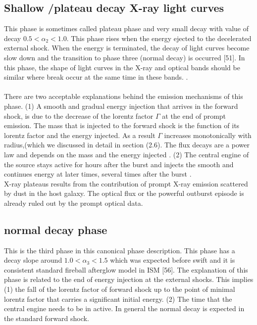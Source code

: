 \subsection{Shallow /plateau decay X-ray light curves }
This phase is sometimes called plateau phase and very small decay with value of decay
$0.5 < \alpha_{2} < 1.0 $. This phase rises when the energy ejected to the decelerated external shock. When the energy is terminated, the decay of light curves become slow down and the transition to phase three (normal decay) is occurred [51]. In this phase, the shape of light curves in the X-ray and optical bands should be similar where break occur at the same time in these bands.\citep{38}\citep{39} .\\\\
There are two acceptable explanations behind the emission mechanisms of this
phase. (1) A smooth and gradual energy injection that arrives in the forward shock,
is due to the decrease of the lorentz factor $ \Gamma $ at the end of prompt emission. The mass that is injected to the forward shock is the function of its lorentz factor and the energy injected. As a result $ \Gamma $ increases monotonically with radius,(which we discussed in detail in section (2.6). The flux decays are a power law and depends on the mass and the energy injected . (2) The central engine of the source stays active for hours after the burst and injects the smooth and continues energy at later times, several times after the burst\citep{40} \citep{41}.\\
X-ray plateaus results from the contribution of prompt X-ray emission scattered
by dust in the host galaxy. The optical flux or the powerful outburst episode is
already ruled out by the prompt optical data\citep{42}.\\
\subsection{normal decay phase}
This is the third phase in this canonical phase description. This phase has a decay
slope around $1.0 < \alpha_{3} < 1.5$ which was expected before swift and it is consistent standard fireball afterglow model in ISM [56]. The explanation of this phase is related to the end of energy injection at the external shocks.
This implies (1) the fall of the lorentz factor of forward shock up to the point of
minimal lorentz factor that carries a significant initial energy. (2) The time that the central engine needs to be in active. In general the normal decay is expected in the standard forward shock.\citep{43}
